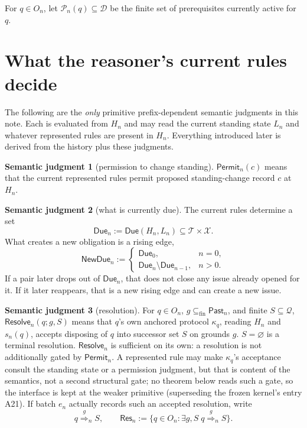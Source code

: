 \documentclass[11pt]{article}
\theoremstyle{definition}
\newtheorem*{semantics}{Semantic judgment}
\theoremstyle{remark}
\newcommand{\fin}{\subseteq_{\mathrm{fin}}}
\newcommand{\Past}{\mathsf{Past}}
\newcommand{\Permit}{\mathsf{Permit}}
\newcommand{\Due}{\mathsf{Due}}
\newcommand{\NewDue}{\mathsf{NewDue}}
\newcommand{\Resolve}{\mathsf{Resolve}}
\newcommand{\Pre}{\mathcal P}
\newcommand{\ResSet}{\mathsf{Res}}
\newcommand{\res}[2]{\overset{#1}{\Longrightarrow}_{#2}}
\begin{document}
For $q\in O_n$, let $\Pre_n(q)\subseteq\mathcal D$ be the finite set of
prerequisites currently active for $q$.

\section{What the reasoner's current rules decide}\label{sec:semantics}

The following are the \emph{only} primitive prefix-dependent semantic
judgments in this note. Each is evaluated from $H_n$ and may read the current
standing state $L_n$ and whatever represented rules are present in $H_n$.
Everything introduced later is derived from the history plus these judgments.

\begin{semantics}[permission to change standing]
$\Permit_n(c)$ means that the current represented rules permit proposed
standing-change record $c$ at $H_n$.
\end{semantics}

\begin{semantics}[what is currently due]
The current rules determine a set
\[
 \Due_n:=\Due(H_n,L_n)\subseteq\mathcal T\times\mathcal X.
\]
What creates a new obligation is a rising edge,
\[
 \NewDue_n:=
 \begin{cases}
   \Due_0,&n=0,\\
   \Due_n\setminus\Due_{n-1},&n>0.
 \end{cases}
\]
If a pair later drops out of $\Due_n$, that does not close any issue already
opened for it. If it later reappears, that is a new rising edge and can create
a new issue.
\end{semantics}

\begin{semantics}[resolution]
For $q\in O_n$, $g\fin\Past_n$, and finite $S\subseteq\mathcal Q$,
$\Resolve_n(q;g,S)$ means that $q$'s own anchored protocol $\kappa_q$, reading
$H_n$ and $s_n(q)$, accepts disposing of $q$ into successor set $S$ on grounds
$g$. $S=\varnothing$ is a terminal resolution. $\Resolve_n$ is sufficient on its
own: a resolution is not additionally gated by $\Permit_n$. A represented rule
may make $\kappa_q$'s acceptance consult the standing state or a permission
judgment, but that is content of the semantics, not a second structural gate;
no theorem below reads such a gate, so the interface is kept at the weaker
primitive (superseding the frozen kernel's entry A21). If batch $e_n$ actually
records such an accepted resolution, write
\[
 q\res{g}{n}S,
 \qquad
 \ResSet_n:=\{q\in O_n:\exists g,S\;q\res{g}{n}S\}.
\]
\end{semantics}
\end{document}
